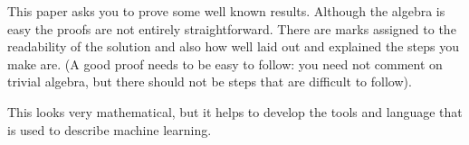 \documentclass[answers]{sotonExamBoxes}    %
\begin{document}


\maketitle

This paper asks you to prove some well known results.  Although the
algebra is easy the proofs are not entirely straightforward.  There
are marks assigned to the readability of the solution and also how
well laid out and explained the steps you make are. (A good proof
needs to be easy to follow: you need not comment on trivial algebra,
but there should not be steps that are difficult to follow).

This looks very mathematical, but it helps to develop the tools and
language that is used to describe machine learning.




\end{document}
